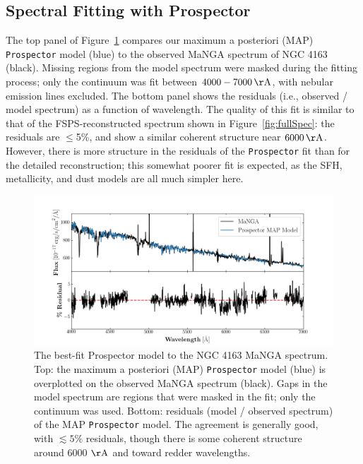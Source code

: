 \documentclass[preprint2]{aastex62}
\begin{document}
\subsection{Spectral Fitting with Prospector}\label{sec:results:pros}

The top panel of Figure~\ref{fig:prospector_spec} compares our maximum a posteriori (MAP) \texttt{Prospector} model (blue) to the observed MaNGA spectrum of NGC 4163 (black). Missing regions from the model spectrum were masked during the fitting process; only the continuum was fit between $4000-7000\,\mathrm{\AA}$, with nebular emission lines excluded. The bottom panel shows the residuals (i.e., observed / model spectrum) as a function of wavelength. The quality of this fit is similar to that of the FSPS-reconstructed spectrum shown in Figure~\ref{fig:fullSpec}: the residuals are $\leq$5\%, and show a similar coherent structure near $6000\,\mathrm{\AA}$. However, there is more structure in the residuals of the \texttt{Prospector} fit than for the detailed reconstruction; this somewhat poorer fit is expected, as the SFH, metallicity, and dust models are all much simpler here.

\begin{figure}[!ht]
\begin{centering}
\includegraphics[width=\linewidth]{figs/prospector-spec-resid.png}
\caption{{\sc The best-fit Prospector model to the NGC 4163 MaNGA spectrum.} Top: the maximum a posteriori (MAP) \texttt{Prospector} model (blue) is overplotted on the observed MaNGA spectrum (black). Gaps in the model spectrum are regions that were masked in the fit; only the continuum was used. Bottom: residuals (model / observed spectrum) of the MAP \texttt{Prospector} model. The agreement is generally good, with $\lesssim5\%$ residuals, though there is some coherent structure around 6000 $\mathrm{\AA}$ and toward redder wavelengths. \label{fig:prospector_spec}}
\end{centering}
\end{figure}
\end{document}
